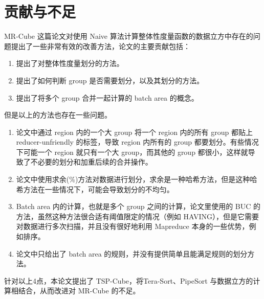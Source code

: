 \section{贡献与不足}

MR-Cube \cite{nandi2011distributed} 这篇论文对使用 Naive 算法计算整体性度量函数的数据立方中存在的问题提出了一些非常有效的改善方法，论文的主要贡献包括：

\begin{enumerate}
\item 提出了对整体性度量划分的方法。
\item 提出了如何判断 group 是否需要划分，以及其划分的方法。
\item 提出了将多个 group 合并一起计算的 batch area 的概念。
\end{enumerate}

但是以上的方法也存在一些问题。

\begin{enumerate}
\item 论文中通过 region 内的一个大 group 将一个 region 内的所有 group 都贴上 reducer-unfriendly 的标签，导致 region 内所有的 group 都要划分。有些情况下可能一个 region 就只有一个大 group，而其他的 group 都很小，这样就导致了不必要的划分和加重后续的合并操作。
\item 论文中使用求余(\%)方法对数据进行划分，求余是一种哈希方法，但是这种哈希方法在一些情况下，可能会导致划分的不均匀。
\item Batch area 内的计算，也就是多个 group 之间的计算，论文里使用的 BUC 的方法，虽然这种方法很合适有阈值限定的情况（例如 HAVING），但是它需要对数据进行多次扫描，并且没有很好地利用 Mapreduce 本身的一些优势，例如排序。
\item 论文中只给出了 batch area 的规则，并没有提供简单且能满足规则的划分方法。
\end{enumerate}

针对以上4点，本论文提出了 TSP-Cube，将Tera-Sort、PipeSort 与数据立方的计算相结合，从而改进对 MR-Cube 的不足。





